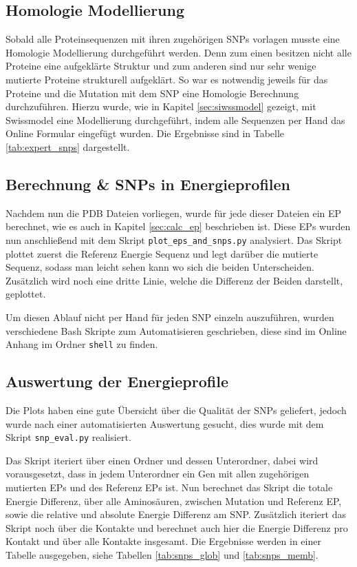 \subsection{Homologie Modellierung}

Sobald alle Proteinsequenzen mit ihren zugehörigen \ac{SNP}s vorlagen musste eine Homologie Modellierung durchgeführt werden. Denn zum einen besitzen nicht alle Proteine eine aufgeklärte Struktur und zum anderen sind nur sehr wenige mutierte Proteine strukturell aufgeklärt. So war es notwendig jeweils für das Proteine und die Mutation mit dem \ac{SNP} eine Homologie Berechnung durchzuführen. Hierzu wurde, wie in Kapitel \ref{sec:siwssmodel} gezeigt, mit Swissmodel eine Modellierung durchgeführt, indem alle Sequenzen per Hand das Online Formular eingefügt wurden. Die Ergebnisse sind in Tabelle \ref{tab:expert_snps} dargestellt.


\subsection{Berechnung \& SNPs in Energieprofilen}
\label{sec:plot_eps}

Nachdem nun die \ac{PDB} Dateien vorliegen, wurde für jede dieser Dateien ein \ac{EP} berechnet, wie es auch in Kapitel \ref{sec:calc_ep} beschrieben ist. Diese \ac{EP}s wurden nun anschließend mit dem Skript \texttt{plot\_eps\_and\_snps.py} analysiert. Das Skript plottet zuerst die Referenz Energie Sequenz und legt darüber die mutierte Sequenz, sodass man leicht sehen kann wo sich die beiden Unterscheiden. Zusätzlich wird noch eine dritte Linie, welche die Differenz der Beiden darstellt, geplottet.

Um diesen Ablauf nicht per Hand für jeden \ac{SNP} einzeln auszuführen, wurden verschiedene Bash Skripte zum Automatisieren geschrieben, diese sind im Online Anhang im Ordner \texttt{shell} zu finden.


\subsection{Auswertung der Energieprofile}
\label{sec:auswertung_eps}

Die Plots haben eine gute Übersicht über die Qualität der \ac{SNP}s geliefert, jedoch wurde nach einer automatisierten Auswertung gesucht, dies wurde mit dem Skript \texttt{snp\_eval.py} realisiert.

Das Skript iteriert über einen Ordner und dessen Unterordner, dabei wird vorausgesetzt, dass in jedem Unterordner ein Gen mit allen zugehörigen mutierten \ac{EP}s und des Referenz \ac{EP}s ist. Nun berechnet das Skript die totale Energie Differenz, über alle Aminosäuren, zwischen Mutation und Referenz \ac{EP}, sowie die relative und absolute Energie Differenz am \ac{SNP}. Zusätzlich iteriert das Skript noch über die Kontakte und berechnet auch hier die Energie Differenz pro Kontakt und über alle Kontakte insgesamt. Die Ergebnisse werden in einer Tabelle ausgegeben, siehe Tabellen \ref{tab:snps_glob} und \ref{tab:snps_memb}.


